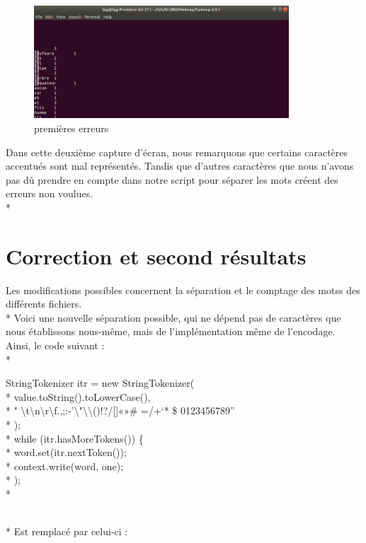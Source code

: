 \documentclass{article}
\begin{document}
\begin{figure}[h]
\begin{center}
\includegraphics[width=0.85\textwidth]{console_resultat_erreur}
\caption{premi\`{e}res erreurs}
\label{fig:firstResultsError}
\end{center}
\end{figure}

Dans cette deuxi\`{e}me capture d'\'{e}cran, nous remarquons que certains caract\`{e}res accentu\'{e}s sont mal repr\'{e}sent\'{e}s. Tandis que d'autres caract\`{e}res que nous n'avons pas d\^{u} prendre en compte dans notre script pour s\'{e}parer les mots cr\'{e}ent des erreurs non voulues. \\*


\section{Correction et second r\'{e}sultats}

Les modifications possibles concernent la s\'{e}paration et le comptage des motss des diff\'{e}rents fichiers. \\*
Voici une nouvelle s\'{e}paration possible, qui ne d\'{e}pend pas de caract\`{e}res que nous \'{e}tablissons nous-m\^{e}me, mais de l'impl\'{e}mentation m\^{e}me de l'encodage. Ainsi, le code suivant : \\*

\begin{tcolorbox}
StringTokenizer itr = new StringTokenizer( \\*
\tabto{1cm} value.toString().toLowerCase(), \\*
\tabto{1cm} " \textbackslash t\textbackslash n\textbackslash r\textbackslash f.,;:-'\textbackslash "\textbackslash \textbackslash ()!?/{[}]«»\# =/+`* \$ 0123456789” \\*
); \\*
while (itr.hasMoreTokens()) \{ \\*
\tabto{1cm} word.set(itr.nextToken()); \\*
\tabto{1cm} context.write(word, one); \\*
); \\*
\end{tcolorbox}
~ \\*
Est remplac\'{e} par celui-ci :
\end{document}
